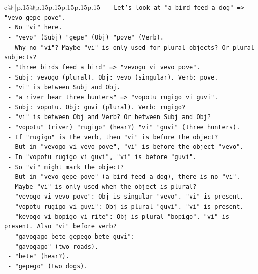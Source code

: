 \documentclass{article}
\begin{document}
{\begin{supertabular}{c@{$\;$}|p{.15\linewidth}@{}p{.15\linewidth}p{.15\linewidth}p{.15\linewidth}p{.15\linewidth}p{.15\linewidth}}
{{{\texttt{  {-} Let's look at "a bird feed a dog" => "vevo gepe pove".} \\
\texttt{    {-} No "vi" here.} \\
\texttt{    {-} "vevo" (Subj) "gepe" (Obj) "pove" (Verb).} \\
\texttt{    {-} Why no "vi"? Maybe "vi" is only used for plural objects? Or plural subjects?} \\
\texttt{    {-} "three birds feed a bird" => "vevogo vi vevo pove".} \\
\texttt{      {-} Subj: vevogo (plural). Obj: vevo (singular). Verb: pove.} \\
\texttt{      {-} "vi" is between Subj and Obj.} \\
\texttt{    {-} "a river hear three hunters" => "vopotu rugigo vi guvi".} \\
\texttt{      {-} Subj: vopotu. Obj: guvi (plural). Verb: rugigo?} \\
\texttt{      {-} "vi" is between Obj and Verb? Or between Subj and Obj?} \\
\texttt{      {-} "vopotu" (river) "rugigo" (hear?) "vi" "guvi" (three hunters).} \\
\texttt{      {-} If "rugigo" is the verb, then "vi" is before the object?} \\
\texttt{      {-} But in "vevogo vi vevo pove", "vi" is before the object "vevo".} \\
\texttt{      {-} In "vopotu rugigo vi guvi", "vi" is before "guvi".} \\
\texttt{      {-} So "vi" might mark the object?} \\
\texttt{      {-} But in "vevo gepe pove" (a bird feed a dog), there is no "vi".} \\
\texttt{      {-} Maybe "vi" is only used when the object is plural?} \\
\texttt{      {-} "vevogo vi vevo pove": Obj is singular "vevo". "vi" is present.} \\
\texttt{      {-} "vopotu rugigo vi guvi": Obj is plural "guvi". "vi" is present.} \\
\texttt{      {-} "kevogo vi bopigo vi rite": Obj is plural "bopigo". "vi" is present. Also "vi" before verb?} \\
\texttt{      {-} "gavogago bete gepego bete guvi":} \\
\texttt{        {-} "gavogago" (two roads).} \\
\texttt{        {-} "bete" (hear?).} \\
\texttt{        {-} "gepego" (two dogs).} \\
}}}
\end{supertabular}}
\end{document}
